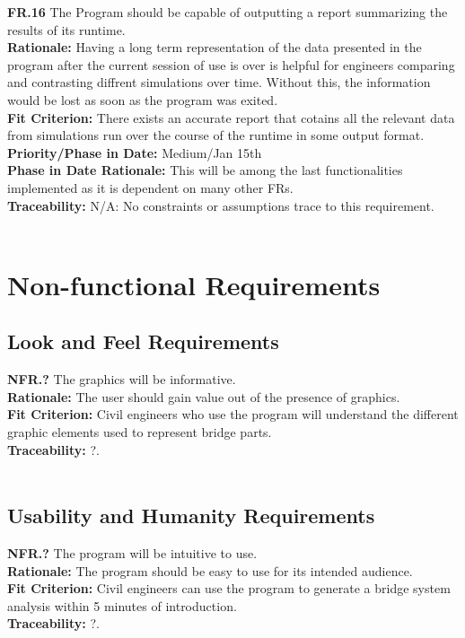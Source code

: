 \documentclass[12pt]{article}
\begin{document}
  \noindent\textbf{FR.16} The Program should be capable of outputting a report summarizing the results of its runtime.\\
  \textbf{Rationale:} Having a long term representation of the data presented in the program after the current session of use is over is helpful for engineers comparing
  and contrasting diffrent simulations over time. Without this, the information would be lost as soon as the program was exited.\\
  \textbf{Fit Criterion:} There exists an accurate report that cotains all the relevant data from simulations run over the course of the runtime in some output format.\\
  \textbf{Priority/Phase in Date:} Medium/Jan 15th\\
  \textbf{Phase in Date Rationale:} This will be among the last functionalities implemented as it is dependent on many other FRs.\\
  \textbf{Traceability:} N/A: No constraints or assumptions trace to this requirement.\\\\


\section{Non-functional Requirements}

\subsection{Look and Feel Requirements}

  \textbf{NFR.?} The graphics will be informative.\\
  \textbf{Rationale:} The user should gain value out of the presence of graphics.\\
  \textbf{Fit Criterion:} Civil engineers who use the program will understand the different graphic elements used to represent bridge parts.\\
  \textbf{Traceability:} ?.\\\\

\subsection{Usability and Humanity Requirements}

  \textbf{NFR.?} The program will be intuitive to use.\\
  \textbf{Rationale:} The program should be easy to use for its intended audience.\\
  \textbf{Fit Criterion:} Civil engineers can use the program to generate a bridge system analysis within 5 minutes of introduction.\\
  \textbf{Traceability:} ?.\\\\
\end{document}
